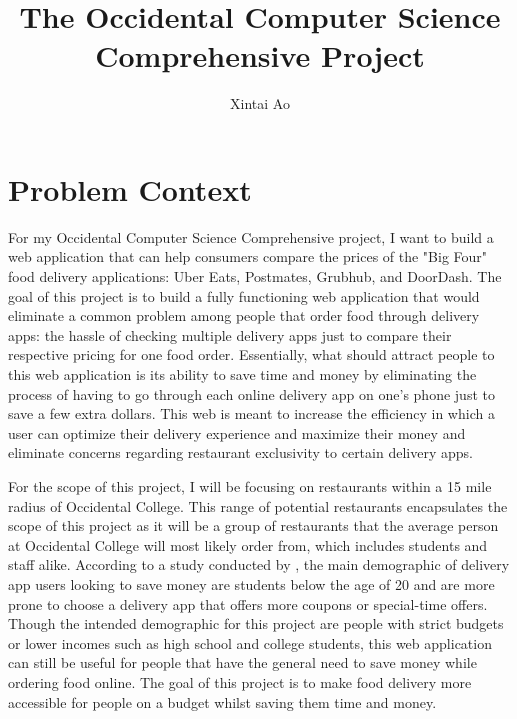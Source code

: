 \documentclass[10pt,twocolumn]{article}
\title{The Occidental Computer Science Comprehensive Project}
\author{Xintai Ao}
\affiliation{Occidental College}
\begin{document}
\maketitle
\section{Problem Context}

For my Occidental Computer Science Comprehensive project, I want to build a web application that can help consumers compare the prices of the "Big Four" food delivery applications: Uber Eats, Postmates, Grubhub, and DoorDash. The goal of this project is to build a fully functioning web application that would eliminate a common problem among people that order food through delivery apps: the hassle of checking multiple delivery apps just to compare their respective pricing for one food order. Essentially, what should attract people to this web application is its ability to save time and money by eliminating the process of having to go through each online delivery app on one's phone just to save a few extra dollars. This web is meant to increase the efficiency in which a user can optimize their delivery experience and maximize their money and eliminate concerns regarding restaurant exclusivity to certain delivery apps. 

For the scope of this project, I will be focusing on restaurants within a 15 mile radius of Occidental College. This range of potential restaurants encapsulates the scope of this project as it will be a group of restaurants that the average person at Occidental College will most likely order from, which includes students and staff alike. According to a study conducted by , the main demographic of delivery app users looking to save money are students below the age of 20 and are more prone to choose a delivery app that offers more coupons or special-time offers. Though the intended demographic for this project are people with strict budgets or lower incomes such as high school and college students, this web application can still be useful for people that have the general need to save money while ordering food online. The goal of this project is to make food delivery more accessible for people on a budget whilst saving them time and money. 
\end{document}
